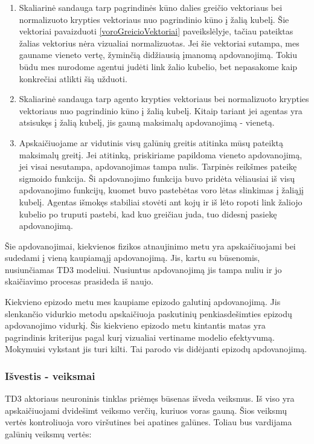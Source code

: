 \documentclass[a4paper, 12pt]{article}
\begin{document}
\begin{enumerate}
  \addtolength{\itemsep}{-0.5\baselineskip} 
  \item Skaliarinė sandauga tarp pagrindinės kūno dalies greičio vektoriaus bei normalizuoto krypties vektoriaus nuo pagrindinio kūno į žalią kubelį. Šie vektoriai pavaizduoti \ref{voroGreicioVektoriai} paveikslėlyje, tačiau pateiktas žalias vektorius nėra vizualiai normalizuotas. Jei šie vektoriai sutampa, mes gauname vieneto vertę, žyminčią didžiausią įmanomą apdovanojimą. Tokiu būdu mes nurodome agentui judėti link žalio kubelio, bet nepasakome kaip konkrečiai atlikti šią užduoti.
  \item Skaliarinė sandauga tarp agento krypties vektoriaus bei normalizuoto krypties vektoriaus nuo pagrindinio kūno į žalią kubelį. Kitaip tariant jei agentas yra atsisukęs į žalią kubelį, jis gauną maksimalų apdovanojimą - vienetą.
  \item Apskaičiuojame ar vidutinis visų galūnių greitis atitinka mūsų pateiktą maksimalų greitį. Jei atitinką, priskiriame papildoma vieneto apdovanojimą, jei visai nesutampa, apdovanojimas tampa nulis. Tarpinės reikšmes pateikę sigmoido funkcija. Ši apdovanojimo funkcija buvo pridėta vėliausiai iš visų apdovanojimo funkcijų, kuomet buvo pastebėtas voro lėtas slinkimas į žaliąjį kubelį. Agentas išmokęs stabiliai stovėti ant kojų ir iš lėto ropoti link žaliojo kubelio po truputi pastebi, kad kuo greičiau juda, tuo didesnį pasiekę apdovanojimą. 
\end{enumerate}

Šie apdovanojimai, kiekvienos fizikos atnaujinimo metu yra apskaičiuojami bei sudedami į vieną kaupiamąjį apdovanojimą. Jis, kartu su būsenomis, nusiunčiamas TD3 modeliui. Nusiuntus apdovanojimą jis tampa nuliu ir jo skaičiavimo procesas prasideda iš naujo.

Kiekvieno epizodo metu mes kaupiame epizodo galutinį apdovanojimą. Jis slenkančio vidurkio metodu apskaičiuoja paskutinių penkiasdešimties epizodų apdovanojimo vidurkį. Šis kiekvieno epizodo metu kintantis matas yra pagrindinis kriterijus pagal kurį vizualiai vertiname modelio efektyvumą. Mokymuisi vykstant jis turi kilti. Tai parodo vis didėjanti epizodų apdovanojimą.

\subsubsection{Išvestis - veiksmai}

TD3 aktoriaus neuroninis tinklas priėmęs būsenas išveda veiksmus. Iš viso yra apskaičiuojami dvidešimt veiksmo verčių, kuriuos voras gauną. Šios veiksmų vertės kontroliuoja voro viršutines bei apatines galūnes. Toliau bus vardijama galūnių veiksmų vertės:
\end{document}
